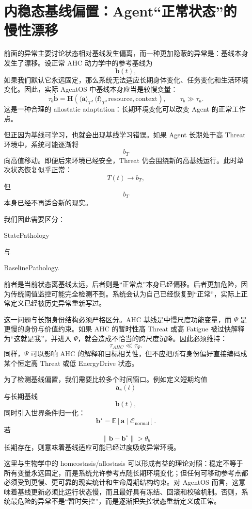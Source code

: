 \section{内稳态基线偏置：Agent“正常状态”的慢性漂移}
\label{sec:ahc_baseline_bias}

前面的异常主要讨论状态相对基线发生偏离，而一种更加隐蔽的异常是：基线本身发生了漂移。设正常 AHC 动力学中的参考基线为
\[
\mathbf b(t),
\]
如果我们默认它永远固定，那么系统无法适应长期身体变化、任务变化和生活环境变化。因此，实际 AgentOS 中基线本身应当是较慢变量：
\[
\tau_b\dot{\mathbf b}
=
\mathbf H
\left(
\langle\mathbf a\rangle_T,
\langle\mathbf f\rangle_T,
\text{resource},
\text{context}
\right),
\qquad
\tau_b\gg\tau_a.
\]
这是一种合理的 allostatic adaptation：长期环境变化可以改变 Agent 的正常工作点。

但正因为基线可学习，也就会出现基线学习错误。如果 Agent 长期处于高 Threat 环境中，系统可能逐渐将
\[
b_T
\]
向高值移动。即便后来环境已经安全，Threat 仍会围绕新的高基线运行。此时单次状态恢复似乎正常：
\[
T(t)\rightarrow b_T,
\]
但
\[
b_T
\]
本身已经不再适合新的现实。

我们因此需要区分：
\begin{statementbox}
StatePathology
\end{statementbox}
与
\begin{statementbox}
BaselinePathology.
\end{statementbox}
前者是当前状态离基线太远，后者则是“正常点”本身已经偏移。后者更加危险，因为传统阈值监控可能完全检测不到。系统会认为自己已经恢复到“正常”，实际上正常定义已经被历史异常重新写过。

这一问题与长期身份结构必须严格区分。AHC 基线是中慢尺度功能变量，而 $\Psi$ 是更慢的身份与价值约束。如果 AHC 的暂时性高 Threat 或高 Fatigue 被过快解释为“这就是我”，并进入 $\Psi$，就会造成不恰当的跨尺度沉降。因此必须维持：
\[
\tau_{AHC}
\ll
\tau_\Psi.
\]
同样，$\Psi$ 可以影响 AHC 的解释和目标相关性，但不应把所有身份偏好直接编码成某个恒定高 Threat 或低 EnergyDrive 状态。

为了检测基线偏置，我们需要比较多个时间窗口。例如定义短期均值
\[
\bar{\mathbf a}_s(t)
\]
与长期基线
\[
\mathbf b(t),
\]
同时引入世界条件归一化：
\[
\mathbf b^\star
=
\mathbb E
\left[
\mathbf a
\mid
\mathcal C_{\mathrm{normal}}
\right].
\]
若
\[
\|\mathbf b-\mathbf b^\star\|
>
\theta_b
\]
长期存在，则意味着基线适应可能已经过度吸收异常环境。

这里与生物学中的 homeostasis/allostasis 可以形成有益的理论对照：稳定不等于所有变量永远固定，而是系统允许参考点随长期环境变化；但任何可移动参考点都必须受到更慢、更可靠的现实统计和生命周期结构约束。对 AgentOS 而言，这意味着基线更新必须比运行状态慢，而且最好具有冻结、回滚和校验机制。否则，系统最危险的异常不是“暂时失控”，而是逐渐把失控状态重新定义成正常。

